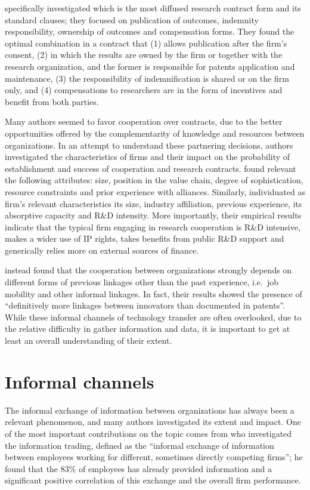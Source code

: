 \citet{Sohn2012} specifically investigated which is the most diffused research contract form and its standard clauses; they focused on publication of outcomes, indemnity responsibility, ownership of outcomes and compensation forms. They found the optimal combination in a contract that (1) allows publication after the firm's consent, (2) in which the results are owned by the firm or together with the research organization, and the former is responsible for patents application and maintenance, (3) the responsibility of indemnification is shared or on the firm only, and (4) compensations to researchers are in the form of incentives and benefit from both parties. 

Many authors seemed to favor cooperation over contracts, due to the better opportunities offered by the complementarity of knowledge and resources between organizations. In an attempt to understand these partnering decisions, authors investigated the characteristics of firms and their impact on the probability of establishment and success of cooperation and research contracts. \citet{Powell1996} found relevant the following attributes: size, position in the value chain, degree of sophistication, resource constraints and prior experience with alliances. Similarly, \citet{Aristei2016} individuated as firm's relevant characteristics its size, industry affiliation, previous experience, its absorptive capacity and R\&D intensity. More importantly, their empirical results indicate that the typical firm engaging in research cooperation is R\&D intensive, makes a wider use of IP rights, takes benefits from public R\&D support and generically relies more on external sources of finance.

\citet{Cantner2006} instead found that the cooperation between organizations strongly depends on different forms of previous linkages other than the past experience, i.e.\ job mobility and other informal linkages. In fact, their results showed the presence of \enquote{definitively more linkages between innovators than documented in patents}. While these informal channels of technology transfer are often overlooked, due to the relative difficulty in gather information and data, it is important to get at least an overall understanding of their extent. 

\section{Informal channels}

The informal exchange of information between organizations has always been a relevant phenomenon, and many authors investigated its extent and impact. One of the most important contributions on the topic comes from \citet{Schrader1991} who investigated the information trading, defined as the \enquote{informal exchange of information between employees working for different, sometimes directly competing firms}; he found that the 83\% of employees has already provided information and a significant positive correlation of this exchange and the overall firm performance.

